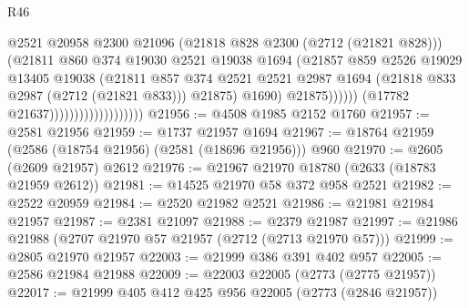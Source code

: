 \begin{lexlean}{R46}
\begin{coremodule}
                                                  @2521
                                                  @20958
                                                  @2300
                                                  @21096
                                                  (@21818 @828 @2300 (@2712 (@21821 @828)))
                                                  (@21811
                                                    @860
                                                    @374
                                                    @19030
                                                    @2521
                                                    @19038
                                                    @1694
                                                    (@21857
                                                      @859
                                                      @2526
                                                      @19029
                                                      @13405
                                                      @19038
                                                      (@21811
                                                        @857
                                                        @374
                                                        @2521
                                                        @2521
                                                        @2987
                                                        @1694
                                                        (@21818 @833 @2987 (@2712 (@21821 @833)))
                                                        @21875)
                                                      @1690)
                                                    @21875))))))
                                        (@17782 @21637)))))))))))))))))))
@21956 := @4508 @1985 @2152 @1760
@21957 := @2581 @21956
@21959 := @1737 @21957 @1694
@21967 := @18764 @21959 (@2586 (@18754 @21956) (@2581 (@18696 @21956))) @960
@21970 := @2605 (@2609 @21957) @2612
@21976 := @21967 @21970 @18780 (@2633 (@18783 @21959 @2612))
@21981 := @14525 @21970 @58 @372 @958 @2521
@21982 := @2522 @20959
@21984 := @2520 @21982 @2521
@21986 := @21981 @21984 @21957
@21987 := @2381 @21097
@21988 := @2379 @21987
@21997 := @21986 @21988 (@2707 @21970 @57 @21957 (@2712 (@2713 @21970 @57)))
@21999 := @2805 @21970 @21957
@22003 := @21999 @386 @391 @402 @957
@22005 := @2586 @21984 @21988
@22009 := @22003 @22005 (@2773 (@2775 @21957))
@22017 := @21999 @405 @412 @425 @956 @22005 (@2773 (@2846 @21957))

\end{coremodule}
\end{lexlean}
